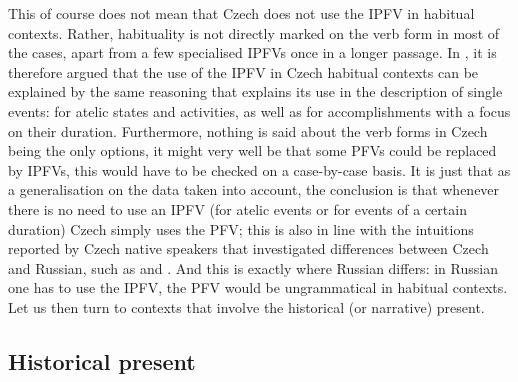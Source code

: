 \documentclass[output=paper,colorlinks,citecolor=brown]{langscibook}
\begin{document}
This of course does not mean that Czech does not use the IPFV in habitual contexts. Rather, habituality is not directly marked on the verb form in most of the cases, apart from a few specialised IPFVs %
once in a longer passage. In \citet{gehrke22}, it is therefore argued that the use of the IPFV in Czech habitual contexts can be explained by the same reasoning that explains its use in the description of single events: for atelic states and activities, as well as for accomplishments with a focus on their duration. Furthermore, nothing is said about the verb forms in Czech being the only options, it might very well be that some PFVs could be replaced by IPFVs, this would have to be checked on a case-by-case basis. It is just that as a generalisation on the data taken into account, the conclusion is that whenever there is no need to use an IPFV (for atelic events or for events of a certain duration) Czech simply uses the PFV; this is also in line with the intuitions reported by Czech native speakers that investigated differences between Czech and Russian, such as \citet{eckert84} and \citet{stunova93}. And this is exactly where Russian differs: in Russian one has to use the IPFV, the PFV would be ungrammatical in habitual contexts. 
Let us then turn to contexts that involve the historical (or narrative) present. 

\subsection{Historical present}
\label{sec:HP}
\end{document}
